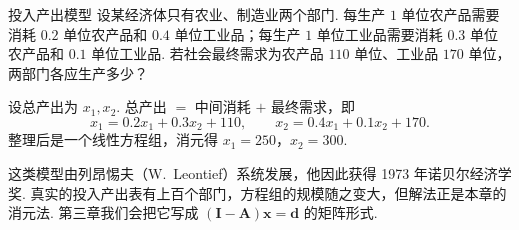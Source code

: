 \documentclass[lang=cn,10.5pt,scheme=chinese,toc=twocol,section,chinesefont=nofont,
twoside,citestyle=gb7714-2015,bibstyle=gb7714-2015]{elegantbook}
\newcommand{\vv}[1]{\boldsymbol{#1}}
\numberwithin{equation}{section}   %
\begin{document}
\begin{linkbox}{投入产出模型}
  设某经济体只有农业、制造业两个部门. 每生产 $1$ 单位农产品需要消耗 $0.2$ 单位农产品和 $0.4$ 单位工业品；每生产 $1$ 单位工业品需要消耗 $0.3$ 单位农产品和 $0.1$ 单位工业品. 若社会最终需求为农产品 $110$ 单位、工业品 $170$ 单位，两部门各应生产多少？

  设总产出为 $x_1,x_2$. 总产出 $=$ 中间消耗 $+$ 最终需求，即
  \[
    x_1=0.2x_1+0.3x_2+110,\qquad x_2=0.4x_1+0.1x_2+170.
  \]
  整理后是一个线性方程组，消元得 $x_1=250$，$x_2=300$.

  这类模型由列昂惕夫（W.~Leontief）系统发展，他因此获得 1973 年诺贝尔经济学奖. 真实的投入产出表有上百个部门，方程组的规模随之变大，但解法正是本章的消元法. 第三章我们会把它写成 $(\vv{I}-\vv{A})\vv{x}=\vv{d}$ 的矩阵形式.
\end{linkbox}
\end{document}
